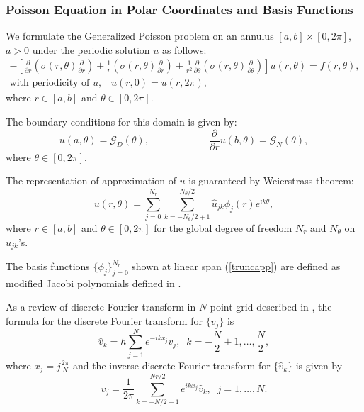 
\subsubsection{Poisson Equation in Polar Coordinates and Basis Functions}

We formulate the Generalized Poisson problem on an annulus $[a, b]\times[0, 2\pi]$, $a > 0$ under the periodic solution $u$ as follows:
\begin{eqnarray}\label{genpois}
-\left[\frac{\partial}{\partial r} (\sigma(r,\theta) \frac{\partial}{\partial r}) + \frac{1}{r} (\sigma(r,\theta) \frac{\partial}{\partial r}) + \frac{1}{r^2}\frac{\partial}{\partial \theta} (\sigma(r,\theta)  \frac{\partial}{\partial \theta})\right] u(r, \theta) = f(r, \theta),\\
\mbox{with periodicity of }u, \;\;\; u(r,0) = u(r,2\pi),
\end{eqnarray}
where $r \in [a, b]$ and $\theta \in [0, 2 \pi]$.

The boundary conditions for this domain is given by:
\begin{equation}
u(a,\theta) = {\mathcal G}_D(\theta), \hspace{1in} \frac{\partial}{\partial r} u(b,\theta) = {\mathcal G}_N(\theta),
\end{equation}
where $\theta \in [0,2\pi]$.

\vspace{0.1in}
The representation of approximation of $u$ is guaranteed by Weierstrass theorem:
\begin{equation}\label{truncapp}
u(r,\theta) = \sum_{j=0}^{N_r} \sum_{k=-N_\theta/2+1}^{N_\theta/2} \hat{u}_{jk} \phi_j(r) e^{ik\theta},
\end{equation}
where $r \in [a, b]$ and $\theta \in [0, 2 \pi]$ for the global degree of freedom $N_r$ and $N_{\theta}$ on $\hat{u}_{jk}$'s.

\vspace{0.1in}

The basis functions $\{\phi_j\}_{j=0}^{N_r}$ shown at linear span
(\ref{truncapp}) are defined as modified Jacobi polynomials
defined in \cite{Karniadarkis}.

\vspace{0.1in}
As a review of discrete Fourier transform in $N$-point grid described in \cite{Trefethen}, the formula for the discrete Fourier transform for $\{v_j\}$ is
\begin{equation}
\hat{v}_k = h \sum_{j=1}^{N} e^{-ikx_j}v_j, \;\; k = -\frac{N}{2}+1, \ldots , \frac{N}{2},
\end{equation}
where $x_j = j\frac{2\pi}{N}$ and the inverse discrete Fourier transform for $\{\hat{v}_k\}$ is given by
\begin{equation}
v_j = \frac{1}{2\pi}\sum_{k = -N/2+1}^{Nr/2}e^{ikx_j}\hat{v}_k,\;\; j = 1, \ldots, N.
\end{equation}


